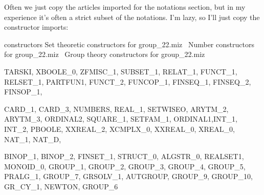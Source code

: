Often we just copy the articles imported for the notations section, but
in my experience it's often a strict subset of the notations. I'm lazy,
so I'll just copy the constructor imports:

\nwenddocs{}\endmoddef\nwstartdeflinemarkup{}\nwenddeflinemarkup
constructors \LA{}Set theoretic constructors for \code{}group{\_}22.miz\edoc{}~{\nwtagstyle{}}\RA{}
  \LA{}Number constructors for \code{}group{\_}22.miz\edoc{}~{\nwtagstyle{}}\RA{}
  \LA{}Group theory constructors for \code{}group{\_}22.miz\edoc{}~{\nwtagstyle{}}\RA{}
\nwendcode{}\nwdocspar

\nwenddocs{}\endmoddef\nwstartdeflinemarkup{}\nwenddeflinemarkup
TARSKI, XBOOLE_0, ZFMISC_1, SUBSET_1, RELAT_1, FUNCT_1,
RELSET_1, PARTFUN1, FUNCT_2, FUNCOP_1, FINSEQ_1, FINSEQ_2, FINSOP_1,
\nwendcode{}\nwdocspar

\nwenddocs{}\endmoddef\nwstartdeflinemarkup{}\nwenddeflinemarkup
CARD_1, CARD_3, NUMBERS, REAL_1, SETWISEO,
ARYTM_2, ARYTM_3, ORDINAL2, SQUARE_1,
SETFAM_1, ORDINAL1,INT_1, INT_2, PBOOLE,
XXREAL_2, XCMPLX_0, XXREAL_0, XREAL_0,  NAT_1, NAT_D,
\nwendcode{}\nwdocspar

\nwenddocs{}\endmoddef\nwstartdeflinemarkup{}\nwenddeflinemarkup
BINOP_1, BINOP_2, FINSET_1, STRUCT_0, ALGSTR_0, REALSET1, MONOID_0,
GROUP_1, GROUP_2, GROUP_3, GROUP_4, GROUP_5, PRALG_1, GROUP_7, GRSOLV_1,
AUTGROUP, GROUP_9, GROUP_10, GR_CY_1, NEWTON, GROUP_6
\nwendcode{}\nwdocspar

